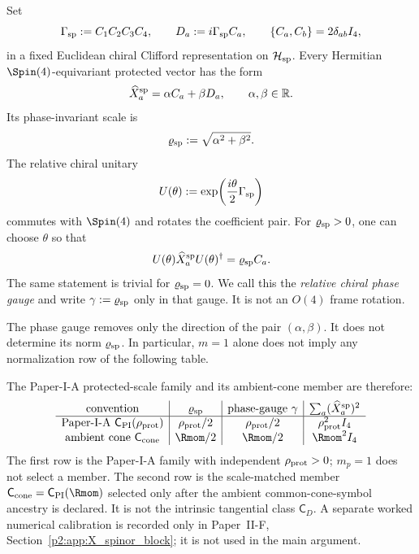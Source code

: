 \documentclass[12pt,a4paper]{article}
\begin{document}
\begin{corollary}
\label{p2:cor:protected-phase-normalization-freedom}
Set
\[
\Gamma_{\rm sp}:=C_1C_2C_3C_4,
\qquad
D_a:=i\Gamma_{\rm sp}C_a,
\qquad
\{C_a,C_b\}=2\delta_{ab}I_4,
\]
in a fixed Euclidean chiral Clifford representation on
\(\mathcal H_{\rm sp}\).  Every Hermitian \(\Spin(4)\)-equivariant protected
vector has the form
\begin{equation}
\label{p2:eq:protected-two-parameter-vector}
\widehat X_a^{\rm sp}=\alpha C_a+\beta D_a,
\qquad
\alpha,\beta\in\mathbb R.
\end{equation}
Its phase-invariant scale is
\[
\varrho_{\rm sp}:=\sqrt{\alpha^2+\beta^2}.
\]
The relative chiral unitary
\begin{equation}
\label{p2:eq:relative-chiral-unitary}
U(\theta):=\exp\!\left(\frac{i\theta}{2}\Gamma_{\rm sp}\right)
\end{equation}
commutes with \(\Spin(4)\) and rotates the coefficient pair.  For
\(\varrho_{\rm sp}>0\), one can choose \(\theta\) so that
\[
U(\theta)\widehat X_a^{\rm sp}U(\theta)^\dagger=\varrho_{\rm sp} C_a.
\]
The same statement is trivial for \(\varrho_{\rm sp}=0\).  We call this the
\emph{relative chiral phase gauge} and write
\(\gamma:=\varrho_{\rm sp}\) only in that gauge.  It is not an \(O(4)\)
frame rotation.

The phase gauge removes only the direction of the pair
\((\alpha,\beta)\).  It does not determine its norm
\(\varrho_{\rm sp}\).  In particular, \(m=1\) alone does not imply any
normalization row of the following table.

The Paper-I-A protected-scale family and its ambient-cone member are therefore:
\[
\begin{array}{c|c|c|c}
\text{convention} & \varrho_{\rm sp} &
\text{phase-gauge }\gamma &
\sum_a(\widehat X_a^{\rm sp})^2\\
\hline
\text{Paper-I-A }\mathsf C_{\rm PI}(\rho_{\rm prot})
& \rho_{\rm prot}/2 & \rho_{\rm prot}/2 & \rho_{\rm prot}^2 I_4\\
\text{ambient cone }\mathsf C_{\rm cone}
& \Rmom/2 & \Rmom/2 & \Rmom^2 I_4
\end{array}
\]
The first row is the Paper-I-A family with independent
\(\rho_{\rm prot}>0\); \(m_p=1\) does not select a member.  The second row is
the scale-matched member
\(\mathsf C_{\rm cone}=\mathsf C_{\rm PI}(\Rmom)\) selected only after the
ambient common-cone-symbol ancestry is declared.  It is not the intrinsic
tangential class \(\mathsf C_D\).  A separate worked numerical calibration is recorded only in
Paper~II-F, Section~\ref{p2:app:X_spinor_block}; it is not used in the main argument.
\end{corollary}
\end{document}

